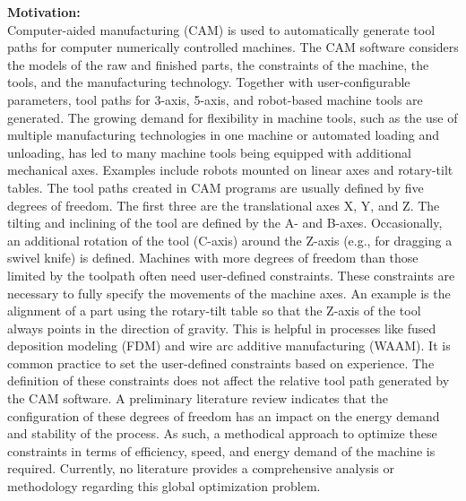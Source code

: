 \vspace{5mm}
\textbf{Motivation:}\\
Computer-aided manufacturing (\acrshort{CAM}) is used to automatically generate tool paths for 
computer numerically controlled machines. The \acrshort{CAM} software considers the models of the 
raw and finished parts, the constraints of the machine, the tools, and the manufacturing 
technology. Together with user-configurable parameters, tool paths for 3-axis, 5-axis, and 
robot-based machine tools are generated. The growing demand for flexibility in machine tools, 
such as the use of multiple manufacturing technologies in one machine or automated loading 
and unloading, has led to many machine tools being equipped with additional mechanical 
axes. Examples include robots mounted on linear axes and rotary-tilt tables.
The tool paths created in \acrshort{CAM} programs are usually defined by five degrees of freedom. The 
first three are the translational axes X, Y, and Z. The tilting and inclining of the tool are defined 
by the A- and B-axes. Occasionally, an additional rotation of the tool (C-axis) around the Z-axis (e.g., for dragging a swivel knife) is defined. Machines with more degrees of freedom than 
those limited by the toolpath often need user-defined constraints. These constraints are 
necessary to fully specify the movements of the machine axes. An example is the alignment 
of a part using the rotary-tilt table so that the Z-axis of the tool always points in the direction of 
gravity. This is helpful in processes like fused deposition modeling (\acrshort{FDM}) and wire arc additive 
manufacturing (\acrshort{WAAM}).
It is common practice to set the user-defined constraints based on experience. The definition 
of these constraints does not affect the relative tool path generated by the \acrshort{CAM} software. A 
preliminary literature review indicates that the configuration of these degrees of freedom has 
an impact on the energy demand and stability of the process. As such, a methodical approach to optimize these constraints in terms of 
efficiency, speed, and energy demand of the machine is required. Currently, no literature
provides a comprehensive analysis or methodology regarding this global optimization 
problem.

